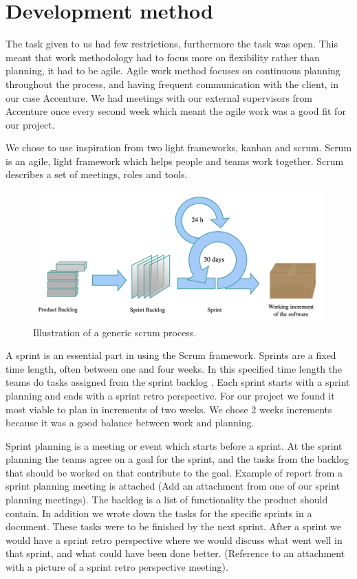 \section{Development method}
The task given to us had few restrictions, furthermore the task was open. This meant that work methodology had to focus more on flexibility rather than planning, it had to be agile. Agile work method focuses on continuous planning throughout the process, and having frequent communication with the client, in our case Accenture. We had meetings with our external supervisors from Accenture once every second week which meant the agile work was a good fit for our project. 

We chose to use inspiration from two light frameworks, kanban and scrum. Scrum is an agile,  light framework which helps people and teams work together. Scrum describes a set of meetings, roles and tools.

\begin{figure}[h!]
	\centering
	\includegraphics[width=1\linewidth]{figures/scrum_process}
	\caption[scrum process]{Illustration of a generic scrum process.}
	\label{fig:scrumprocess}
\end{figure}


A sprint is an essential part in using the Scrum framework. Sprints are a fixed time length, often between one and four weeks. In this specified time length the teams do tasks assigned from the sprint backlog . Each sprint starts with a sprint planning and ends with a sprint retro perspective. For our project we found it most viable to plan in increments of two weeks. We chose 2 weeks increments because it was a good balance between work and planning. 

Sprint planning is a meeting or event which starts before a sprint. At the sprint planning the teams agree on a goal for the sprint, and the tasks from the backlog that should be worked on that contribute to the goal. Example of report from a sprint planning meeting is attached (Add an attachment from one of our sprint planning meetings). The backlog is a list of functionality the product should contain.  In addition we wrote down the tasks for the specific sprints in a document. These tasks were to be finished by the next sprint. After a sprint we would have a sprint retro perspective where we would discuss what went well in that sprint, and what could have been done better. (Reference to an attachment with a picture of  a sprint retro perspective meeting).

